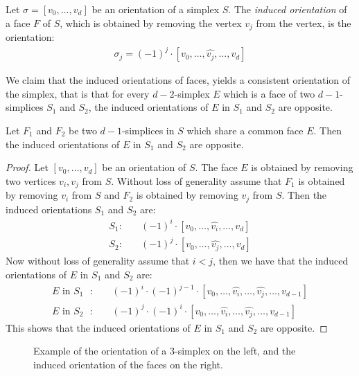 \begin{definition}
	Let $\sigma = [v_0, \dots, v_{d}]$ be an orientation of a simplex $S$. The \emph{induced orientation} of a face $F$ of $S$, which is obtained by removing the vertex $v_j$ from the vertex, is the orientation:
	\begin{align*}
		\sigma_j = (-1)^j \cdot [v_0, \dots, \hat{v_j}, \dots, v_{d}]
	\end{align*}
\end{definition}

We claim that the induced orientations of faces, yields a consistent orientation of the simplex, that is that for every $d-2$-simplex $E$ which is a face of two $d-1$-simplices $S_1$ and $S_2$, the induced orientations of $E$ in $S_1$ and $S_2$ are opposite.

\begin{claim}
	\label{claim:opposite_orientations}
	Let $F_1$ and $F_2$ be two $d-1$-simplices in $S$ which share a common face $E$. Then the induced orientations of $E$ in $S_1$ and $S_2$ are opposite.
\end{claim}
\begin{proof}
	Let $[v_0, \dots, v_{d}]$ be an orientation of $S$. The face $E$ is obtained by removing two vertices $v_i, v_j$ from $S$. Without loss of generality assume that $F_1$ is obtained by removing $v_i$ from $S$ and $F_2$ is obtained by removing $v_j$ from $S$. Then the induced orientations $S_1$ and $S_2$ are:
	\begin{align*}
		S_1: \quad & (-1)^i \cdot [v_0, \dots, \hat{v_i}, \dots, v_{d}] \\
		S_2: \quad & (-1)^j \cdot [v_0, \dots, \hat{v_j}, \dots, v_{d}]
	\end{align*}
	Now without loss of generality assume that $i < j$, then we have that the induced orientations of $E$ in $S_1$ and $S_2$ are:
	\begin{align*}
		\text{$E$ in $S_1$ }: \quad & (-1)^i \cdot (-1)^{j-1} \cdot [v_0, \dots, \hat{v_i}, \dots, \hat{v_j}, \dots, v_{d-1}] \\
		\text{$E$ in $S_2$ }: \quad & (-1)^j \cdot (-1)^i \cdot [v_0, \dots, \hat{v_i}, \dots, \hat{v_j}, \dots, v_{d-1}]
	\end{align*}
	This shows that the induced orientations of $E$ in $S_1$ and $S_2$ are opposite.
\end{proof}

\begin{figure}[ht]
	\centering
	\caption[Orientation of a simplex]{Example of the orientation of a 3-simplex on the left, and the induced orientation of the faces on the right.}
	\label{fig:orientation_of_simplex}
\end{figure}

